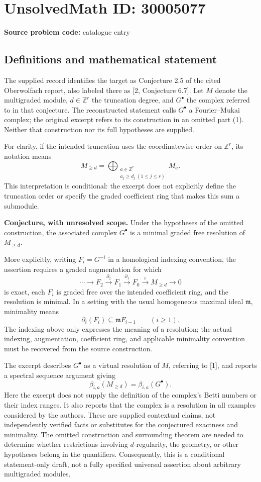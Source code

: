 \documentclass[11pt]{article}
\newcommand{\Z}{\mathbb{Z}}
\begin{document}
\section*{UnsolvedMath ID: 30005077}
\textbf{Source problem code:} catalogue entry
\subsection{Definitions and mathematical statement}
The supplied record identifies the target as Conjecture 2.5 of the cited Oberwolfach report, also labeled there as [2, Conjecture 6.7]. Let \(M\) denote the multigraded module, \(d\in\Z^r\) the truncation degree, and \(G^\bullet\) the complex referred to in that conjecture. The reconstructed statement calls \(G^\bullet\) a Fourier--Mukai complex; the original excerpt refers to its construction in an omitted part (1). Neither that construction nor its full hypotheses are supplied.

For clarity, if the intended truncation uses the coordinatewise order on \(\Z^r\), its notation means
\[
M_{\geq d}=\bigoplus_{\substack{a\in\Z^r\\ a_j\geq d_j\ (1\leq j\leq r)}}M_a.
\]
This interpretation is conditional: the excerpt does not explicitly define the truncation order or specify the graded coefficient ring that makes this sum a submodule.

\textbf{Conjecture, with unresolved scope.} Under the hypotheses of the omitted construction, the associated complex \(G^\bullet\) is a minimal graded free resolution of \(M_{\geq d}\).

More explicitly, writing \(F_i=G^{-i}\) in a homological indexing convention, the assertion requires a graded augmentation for which
\[
\cdots\longrightarrow F_2\xrightarrow{\partial_2}F_1
\xrightarrow{\partial_1}F_0\xrightarrow{\varepsilon}
M_{\geq d}\longrightarrow0
\]
is exact, each \(F_i\) is graded free over the intended coefficient ring, and the resolution is minimal. In a setting with the usual homogeneous maximal ideal \(\mathfrak m\), minimality means
\[
\partial_i(F_i)\subseteq\mathfrak m F_{i-1}\qquad(i\geq1).
\]
The indexing above only expresses the meaning of a resolution; the actual indexing, augmentation, coefficient ring, and applicable minimality convention must be recovered from the source construction.

The excerpt describes \(G^\bullet\) as a virtual resolution of \(M\), referring to [1], and reports a spectral sequence argument giving
\[
\beta_{i,a}(M_{\geq d})=\beta_{i,a}(G^\bullet).
\]
Here the excerpt does not supply the definition of the complex's Betti numbers or their index ranges. It also reports that the complex is a resolution in all examples considered by the authors. These are supplied contextual claims, not independently verified facts or substitutes for the conjectured exactness and minimality. The omitted construction and surrounding theorem are needed to determine whether restrictions involving \(d\)-regularity, the geometry, or other hypotheses belong in the quantifiers. Consequently, this is a conditional statement-only draft, not a fully specified universal assertion about arbitrary multigraded modules.
\end{document}
